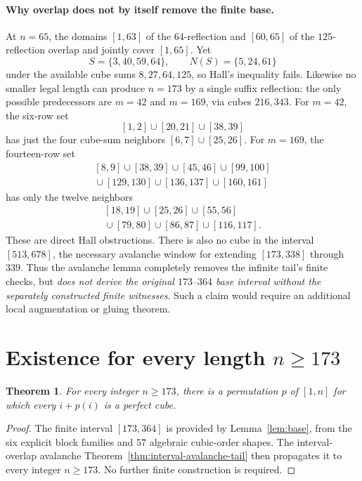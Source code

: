 \documentclass[10pt]{article}
\newtheorem{theorem}{Theorem}
\begin{document}
\paragraph{Why overlap does not by itself remove the finite base.}
At $n=65$, the domains $[1,63]$ of the
$64$-reflection and $[60,65]$ of the
$125$-reflection overlap and jointly cover
$[1,65]$. Yet
\[
S=\{3,40,59,64\},\qquad
N(S)=\{5,24,61\}
\]
under the available cube sums $8,27,64,125$,
so Hall's inequality fails.
Likewise no smaller legal length can produce
$n=173$ by a single suffix reflection:
the only possible predecessors are
$m=42$ and $m=169$, via cubes $216,343$.
For $m=42$, the six-row set
\[
[1,2]\cup[20,21]\cup[38,39]
\]
has just the four cube-sum neighbors
$[6,7]\cup[25,26]$.
For $m=169$, the fourteen-row set
\[
\begin{gathered}
[8,9]\cup[38,39]\cup[45,46]\cup[99,100]\\
{}\cup[129,130]\cup[136,137]\cup[160,161]
\end{gathered}
\]
has only the twelve neighbors
\[
\begin{gathered}
[18,19]\cup[25,26]\cup[55,56]\\
{}\cup[79,80]\cup[86,87]\cup[116,117].
\end{gathered}
\]
These are direct Hall obstructions.
There is also no cube in the interval
$[513,678]$, the necessary avalanche
window for extending $[173,338]$ through
$339$. Thus the avalanche lemma completely
removes the infinite tail's finite checks,
but \emph{does not derive the original
$173$--$364$ base interval without the
separately constructed finite witnesses}.
Such a claim would require an additional
local augmentation or gluing theorem.

\section{Existence for every length $n\ge173$}

\begin{theorem}
For every integer $n\ge173$, there is a
permutation $p$ of $[1,n]$ for which
every $i+p(i)$ is a perfect cube.
\end{theorem}
\begin{proof}
The finite interval $[173,364]$ is provided
by Lemma~\ref{lem:base}, from the
six explicit block families and $57$
algebraic cubic-order shapes.
The interval-overlap avalanche
Theorem~\ref{thm:interval-avalanche-tail}
then propagates it to every integer $n\ge173$.
No further finite construction is required.
\end{proof}
\end{document}
